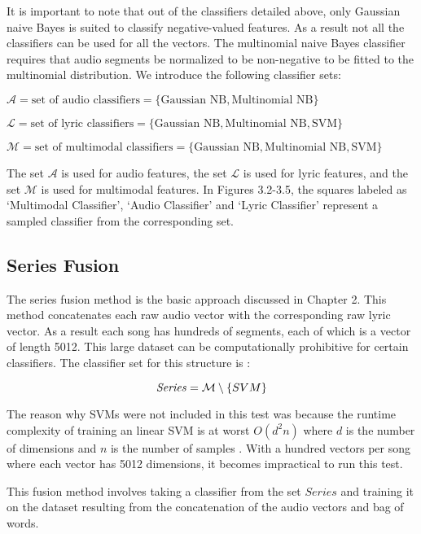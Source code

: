 It is important to note that out of the classifiers detailed above, only Gaussian naive Bayes is suited to classify 
negative-valued features. As a result not all the classifiers can be used for all the vectors.   The multinomial naive Bayes
classifier requires that audio segments be normalized to be non-negative to be fitted to the multinomial distribution. We introduce the
following classifier sets:

$ \mathcal{A} = \text{set of audio classifiers} = \{ \text{Gaussian NB}, \text{Multinomial NB}\} $

$ \mathcal{L} = \text{set of lyric classifiers} = \{ \text{Gaussian NB}, \text{Multinomial NB}, \text{SVM}\} $

$ \mathcal{M} = \text{set of multimodal classifiers} = \{\text{Gaussian NB}, \text{Multinomial NB}, \text{SVM}\} $


The set $\mathcal{A} $ is used for audio features, the set $\mathcal{L}$ is used 
for lyric features, and the set $\mathcal{M}$ is used for multimodal features.  In Figures 3.2-3.5, the squares labeled as
\lq Multimodal Classifier', \lq Audio Classifier' and \lq Lyric Classifier' represent a sampled classifier from the corresponding set.

\subsection*{Series Fusion}

The series fusion method is the basic approach discussed in Chapter 2. This
method concatenates each raw audio vector with the corresponding raw lyric vector. As a result each song has hundreds of segments,
each of which is a vector of length 5012.  This large dataset can be computationally prohibitive for certain classifiers. 
 The classifier set for this structure is : 

\[ \text{\textit{Series}} = \mathcal{M} \setminus \{ SVM\} \]

The reason why SVMs were not included in this test was because 
the runtime complexity of training an linear SVM is at worst $O(d^2n)$ where $d$ is the number of dimensions and $n$ is the number of samples \cite{chapelle2007training}. 
With a hundred vectors per song where each vector has 5012 dimensions, it becomes impractical to run this test.

This fusion method involves taking a classifier from the set $Series$ and training it on the dataset resulting from the concatenation 
of the audio vectors and bag of words.  

